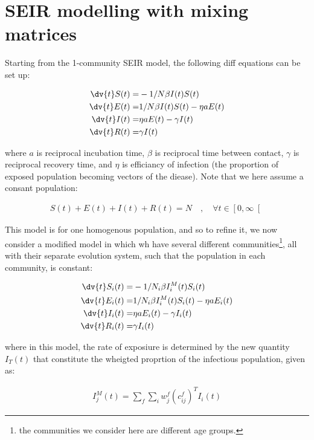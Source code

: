 \section{SEIR modelling with mixing matrices}

Starting from the 1-community SEIR model, the following diff equations can be set up:

\begin{align*}
\dv{t}S(t) =& - 1/N \beta I(t) S(t) \\
\dv{t}E(t) =& 1/N \beta I(t)S(t) - \eta a E(t) \\
\dv{t}I(t) =& \eta a E(t) - \gamma I(t) \\
\dv{t}R(t) =& \gamma I(t)
\end{align*}

where $a$ is reciprocal incubation time,
$\beta$ is reciprocal time between contact,
$\gamma$ is reciprocal recovery time,
and $\eta$ is efficiancy of infection (the proportion of exposed population becoming vectors of the diease).
Note that we here assume a consant population:

\begin{align*}
S(t) + E(t) + I(t) + R(t) = N \quad , \quad \forall t \in \left[ 0, \infty \right[ %
\end{align*}

This model is for one homogenous population, and so to refine it, we now consider a modified model in which wh have several different communities\footnote{the communities we consider here are different age groups.}, all with their separate evolution system, such that the population in each community, is constant:

\begin{align*}
\dv{t}S_{i}(t) =& - 1/N_{i} \beta I^{M}_{i}(t) S_{i}(t) \\
\dv{t}E_{i}(t) =& 1/N_{i} \beta I^{M}_{i}(t)S_{i}(t) - \eta a E_{i}(t) \\
\dv{t}I_{i}(t) =& \eta a E_{i}(t) - \gamma I_{i}(t) \\
\dv{t}R_{i}(t) =& \gamma I_{i}(t)
\end{align*}

where in this model, the rate of exposiure is determined by the new quantity $I_{T}(t)$ that constitute the wheigted proprtion of the infectious population, given as:

\begin{align*}
I^{M}_{j}(t) = \sum_{f}\sum_{i}w^{f}_{j}(c^{f}_{ij})^{T}I_{i}(t)
\end{align*}

